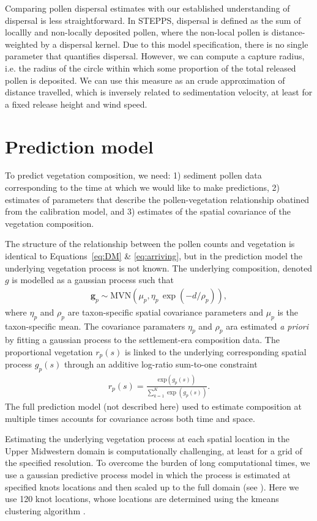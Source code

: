 \documentclass[12pt]{article}
\begin{document}
Comparing pollen dispersal estimates with our established
understanding of dispersal is less straightforward. In STEPPS,
dispersal is defined as the sum of locallly and non-locally deposited
pollen, where the non-local pollen is distance-weighted by a dispersal
kernel. Due to this model specification, there is no single parameter
that quantifies dispersal. However, we can compute a capture radius,
i.e. the radius of the circle within which some proportion of the
total released pollen is deposited. We can use this measure as an
crude approximation of distance travelled, which is inversely related
to sedimentation velocity, at least for a fixed release height and
wind speed.

\section{Prediction model}

To predict vegetation composition, we need: 1) sediment pollen data
corresponding to the time at which we would like to make predictions,
2) estimates of parameters that describe the pollen-vegetation
relationship obatined from the calibration model, and 3) estimates of
the spatial covariance of the vegetation composition.

The structure of the relationship between the pollen counts and
vegetation is identical to Equations~\ref{eq:DM} \& \ref{eq:arriving},
but in the prediction model the underlying vegetation process is not
known. The underlying composition, denoted $g$ is modelled as a
gaussian process such that
\begin{align*}
\bm{g}_p \sim \text{MVN}(\mu_p, \eta_p \, \exp(-d/\rho_p)),
\end{align*}
where $\eta_p$ and $\rho_p$ are taxon-specific spatial covariance
parameters and $\mu_p$ is the taxon-specific mean.  The covariance
paramaters $\eta_p$ and $\rho_p$ ara estimated \textit{a priori} by
fitting a gaussian process to the settlement-era composition data.
The proportional vegetation $r_p(s)$ is linked to the underlying
corresponding spatial process $g_p(s)$ through an additive log-ratio
sum-to-one constraint
\begin{align*}
r_p(s) = \frac{ \text{exp}(g_p(s))}{ \sum_{k=1}^K \exp (g_p(s)) }.
\end{align*} 
The full prediction model (not described here) used to estimate
composition at multiple times accounts for covariance across both time
and space. 

Estimating the underlying vegetation process at each spatial location
in the Upper Midwestern domain is computationally challenging, at
least for a grid of the specified resolution. To overcome the burden
of long computational times, we use a gaussian predictive process
model in which the process is estimated at specified knots locations
and then scaled up to the full domain (see \cite{XXX}). Here we use
120 knot locations, whose locations are determined using the kmeans
clustering algorithm \cite{XXX}.
\end{document}
